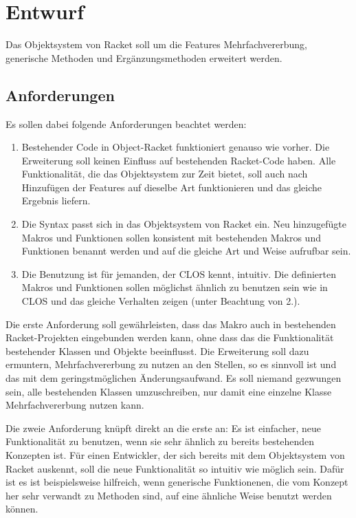 \chapter{Entwurf} 
Das Objektsystem von Racket soll um die Features Mehrfachvererbung, generische Methoden und Ergänzungsmethoden erweitert werden. 

\section{Anforderungen}
Es sollen dabei folgende Anforderungen beachtet werden:
\begin{enumerate}
 \item Bestehender Code in Object-Racket funktioniert genauso wie vorher. Die Erweiterung soll keinen Einfluss auf bestehenden Racket-Code haben. Alle Funktionalität, die das Objektsystem zur Zeit bietet, soll auch nach Hinzufügen der Features auf dieselbe Art funktionieren und das gleiche Ergebnis liefern.
 \item Die Syntax passt sich in das Objektsystem von Racket ein. Neu hinzugefügte Makros und Funktionen sollen konsistent mit bestehenden Makros und Funktionen benannt werden und auf die gleiche Art und Weise aufrufbar sein. 
 \item Die Benutzung ist für jemanden, der CLOS kennt, intuitiv. Die definierten Makros und Funktionen sollen möglichst ähnlich zu benutzen sein wie in CLOS und das gleiche Verhalten zeigen (unter Beachtung von 2.).
\end{enumerate}

Die erste Anforderung soll gewährleisten, dass das Makro auch in bestehenden Racket-Projekten eingebunden werden kann, ohne dass das die Funktionalität bestehender Klassen und Objekte beeinflusst. Die Erweiterung soll dazu ermuntern, Mehrfachvererbung zu nutzen an den Stellen, so es sinnvoll ist und das mit dem geringstmöglichen Änderungsaufwand. Es soll niemand gezwungen sein, alle bestehenden Klassen umzuschreiben, nur damit eine einzelne Klasse Mehrfachvererbung nutzen kann.

Die zweie Anforderung knüpft direkt an die erste an: Es ist einfacher, neue Funktionalität zu benutzen, wenn sie sehr ähnlich zu bereits bestehenden Konzepten ist. Für einen Entwickler, der sich bereits mit dem Objektsystem von Racket auskennt, soll die neue Funktionalität so intuitiv wie möglich sein. Dafür ist es ist beispielsweise hilfreich, wenn generische Funktionenen, die vom Konzept her sehr verwandt zu Methoden sind, auf eine ähnliche Weise benutzt werden können.

